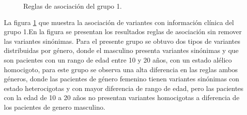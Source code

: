 \begin{figure}[h!]
	\centering
	\caption{Reglas de asociación del grupo 1.}
	\label{fig:reglas1}
\end{figure}

La figura \ref{fig:reglas1} que muestra la asociación de variantes con información clínica del grupo 1.En la figura \label{fig:re1} se presentan los resultados reglas de asociación sin remover las variantes sinónimas. Para el presente grupo se obtuvo dos tipos de variantes  distribuidas por género, donde el masculino presenta variantes  sinónimas y que son pacientes con un rango de edad entre 10 y 20 años, con un estado alélico homocigoto, para este grupo se observa una alta diferencia en las reglas ambos géneros, donde las pacientes de género femenino tienen variantes sinónimas con estado heterocigotas y con mayor diferencia de rango  de edad, pero las pacientes con la edad de 10 a 20 años no presentan variantes homocigotas a diferencia de los pacientes de genero masculino.\\

